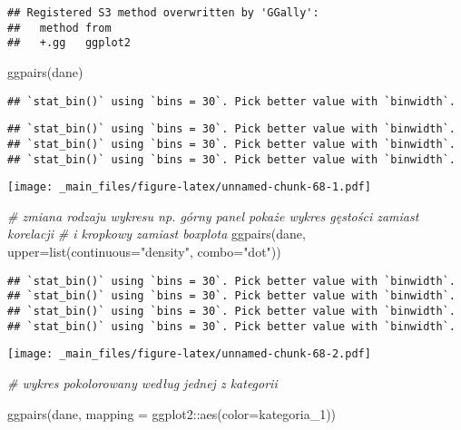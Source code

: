 \documentclass[
]{book}
\newenvironment{Shaded}{\begin{snugshade}}{\end{snugshade}}
\newcommand{\AttributeTok}[1]{\textcolor[rgb]{0.77,0.63,0.00}{#1}}
\newcommand{\CommentTok}[1]{\textcolor[rgb]{0.56,0.35,0.01}{\textit{#1}}}
\newcommand{\FunctionTok}[1]{\textcolor[rgb]{0.00,0.00,0.00}{#1}}
\newcommand{\NormalTok}[1]{#1}
\newcommand{\SpecialCharTok}[1]{\textcolor[rgb]{0.00,0.00,0.00}{#1}}
\newcommand{\StringTok}[1]{\textcolor[rgb]{0.31,0.60,0.02}{#1}}
\begin{document}
\begin{verbatim}
## Registered S3 method overwritten by 'GGally':
##   method from   
##   +.gg   ggplot2
\end{verbatim}

\begin{Shaded}
\begin{Highlighting}[]
\FunctionTok{ggpairs}\NormalTok{(dane)}
\end{Highlighting}
\end{Shaded}

\begin{verbatim}
## `stat_bin()` using `bins = 30`. Pick better value with `binwidth`.
\end{verbatim}

\begin{verbatim}
## `stat_bin()` using `bins = 30`. Pick better value with `binwidth`.
## `stat_bin()` using `bins = 30`. Pick better value with `binwidth`.
## `stat_bin()` using `bins = 30`. Pick better value with `binwidth`.
\end{verbatim}

\texttt{[image: \_main\_files/figure-latex/unnamed-chunk-68-1.pdf]}

\begin{Shaded}
\begin{Highlighting}[]
\CommentTok{\# zmiana rodzaju wykresu np. górny panel pokaże wykres gęstości zamiast korelacji  }
\CommentTok{\# i kropkowy zamiast boxplota}
\FunctionTok{ggpairs}\NormalTok{(dane, }\AttributeTok{upper=}\FunctionTok{list}\NormalTok{(}\AttributeTok{continuous=}\StringTok{"density"}\NormalTok{, }\AttributeTok{combo=}\StringTok{"dot"}\NormalTok{))}
\end{Highlighting}
\end{Shaded}

\begin{verbatim}
## `stat_bin()` using `bins = 30`. Pick better value with `binwidth`.
## `stat_bin()` using `bins = 30`. Pick better value with `binwidth`.
## `stat_bin()` using `bins = 30`. Pick better value with `binwidth`.
## `stat_bin()` using `bins = 30`. Pick better value with `binwidth`.
\end{verbatim}

\texttt{[image: \_main\_files/figure-latex/unnamed-chunk-68-2.pdf]}

\begin{Shaded}
\begin{Highlighting}[]
\CommentTok{\# wykres pokolorowany według jednej z kategorii}

\FunctionTok{ggpairs}\NormalTok{(dane, }\AttributeTok{mapping =}\NormalTok{ ggplot2}\SpecialCharTok{::}\FunctionTok{aes}\NormalTok{(}\AttributeTok{color=}\NormalTok{kategoria\_1))}
\end{Highlighting}
\end{Shaded}
\end{document}
